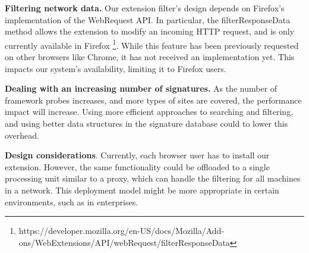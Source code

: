 
\textbf{Filtering network data.} Our extension filter's design depends on Firefox's implementation of the WebRequest API. In particular, the filterResponseData method allows the extension to modify an incoming HTTP request, and is only currently available in Firefox \footnote{https://developer.mozilla.org/en-US/docs/Mozilla/Add-ons/WebExtensions/API/webRequest/filterResponseData}. While
this feature has been previously requested on other browsers like Chrome, it has not received an implementation yet. This 
impacts our system's availability, limiting it to Firefox users.

\textbf{Dealing with an increasing number of signatures.} As the number of framework probes increases, and more types of sites are covered, the performance impact will increase. Using more efficient approaches to searching and filtering, and using better data structures in the signature database could to lower this overhead.


\textbf{Design considerations}. Currently, each browser user has to install our extension. However, the same functionality could be offloaded to a single processing unit similar to a proxy, which can handle the filtering for all machines in a network. This deployment model might be more appropriate in certain environments, such as in enterprises.



